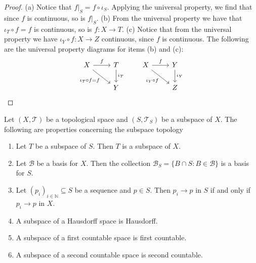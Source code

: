 \begin{proof}
  (a) Notice that \(f|_S = f \circ \iota_S\). Applying the universal property,
  we find that since \(f\) is continuous, so is \(f|_S\). (b) From the universal
  property we have that \(\iota_T \circ f = f\) is continuous, so is \(f: X \to
  T\). (c) Notice that from the universal property we have \(\iota_Y \circ f: X
  \to Z\) continuous, since \(f\) is continuous. The following are the universal
  property diagrams for items (b) and (c):
  \[
    \begin{tikzcd}
      X \rar["f"] \ar[rd, swap, "\iota_T \circ f = f"] &T \dar["\iota_T"] \\ &Y
    \end{tikzcd} 
    \qquad
    \begin{tikzcd}
      X \rar["f"] \ar[rd, swap, "\iota_Y \circ f"] &Y \dar["\iota_Y"] \\ &Z
    \end{tikzcd}
  \]
\end{proof}

\begin{proposition}\label{prop: subspace properties}
  Let \((X, \mathcal T)\) be a topological space and \((S, \mathcal T_S)\) be a
  subspace of \(X\). The following are properties concerning the subspace
  topology
  \begin{enumerate}[(SP1)]
    \item\label{prop: subspace transitivity}
      Let \(T\) be a subspace of \(S\). Then \(T\) is a subspace of \(X\).  \item\label{prop: basis for subspace} Let \(\mathcal B\) be a basis for \(X\). Then the collection \(\mathcal B_S = \{B \cap S : B \in \mathcal B\}\) is a basis for \(S\).
    \item\label{prop: convergence subspace}
      Let \((p_i)_{i \in \mathbb{N}} \subseteq S\) be a sequence and \(p \in
      S\). Then \(p_i \to p\) in \(S\) if and only if \(p_i \to p\) in \(X\).
    \item\label{prop: Hausdorff implies Hausdorff subspace}
      A subspace of a Hausdorff space is Hausdorff.
    \item\label{prop: firs count implies first count subspace}
      A subspace of a first countable space is first countable.
    \item\label{prop: sec count implies sec count subspace}
      A subspace of a second countable space is second countable.
  \end{enumerate}
\end{proposition}

